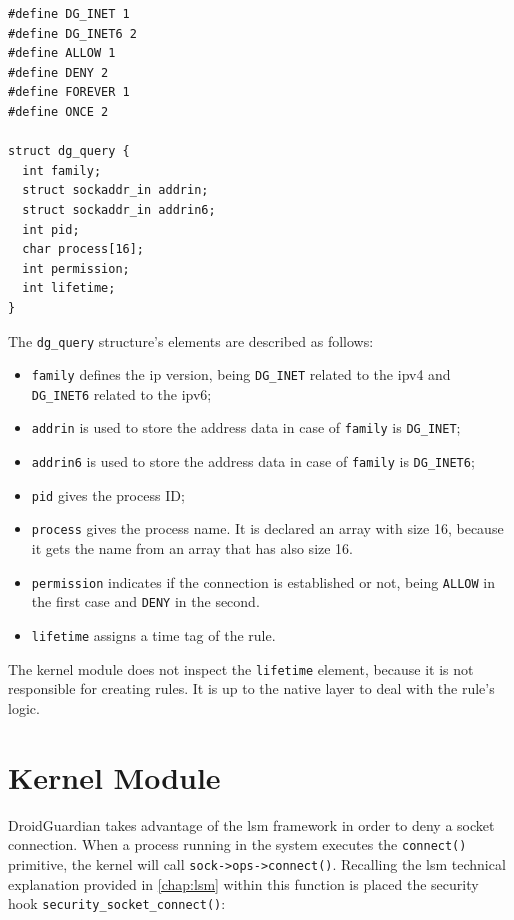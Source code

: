 \begin{lstlisting}[style=CInputStyle, caption=\texttt{security\_socket\_connect} hook (Linux kernel v3.11)]
#define DG_INET 1
#define DG_INET6 2
#define ALLOW 1
#define DENY 2
#define FOREVER 1
#define ONCE 2

struct dg_query {
  int family;
  struct sockaddr_in addrin;
  struct sockaddr_in addrin6;
  int pid;
  char process[16];
  int permission;
  int lifetime;
} 
\end{lstlisting}

The \texttt{dg\_query} structure's elements are described as follows:
\begin{itemize}
\item \texttt{family} defines the \gls{ip} version, being \texttt{DG\_INET} related to the \gls{ip}v4 and \texttt{DG\_INET6} related to the \gls{ip}v6;
\item \texttt{addrin} is used to store the address data in case of \texttt{family} is \texttt{DG\_INET};
\item \texttt{addrin6} is used to store the address data in case of \texttt{family} is \texttt{DG\_INET6};
\item \texttt{pid} gives the process ID;
\item \texttt{process} gives the process name. It is declared an array with size 16, because it gets the name from an array that has also size 16.
\item \texttt{permission} indicates if the connection is established or not, being \texttt{ALLOW} in the first case and \texttt{DENY} in the second.
\item \texttt{lifetime} assigns a time tag of the rule.
\end{itemize}

The kernel module does not inspect the \texttt{lifetime} element, because it is not responsible for creating rules. It is up to the native layer to deal with the rule's logic.

\section{Kernel Module}

DroidGuardian takes advantage of the \gls{lsm} framework in order to deny a socket connection. When a process running in the system executes the \texttt{connect()} primitive, the kernel will call \texttt{sock->ops->connect()}. Recalling the \gls{lsm} technical explanation provided in \autoref{chap:lsm} within this function is placed the security hook \texttt{security\_socket\_connect()}:

